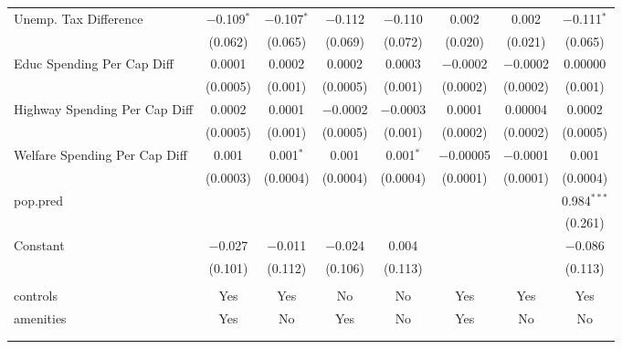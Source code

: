 \begin{table}[!htbp]
\begin{tabular}{@{\extracolsep{5pt}}lccccccc}
  Unemp. Tax Difference & $-$0.109$^{*}$ & $-$0.107$^{*}$ & $-$0.112 & $-$0.110 & 0.002 & 0.002 & $-$0.111$^{*}$ \\ 
  & (0.062) & (0.065) & (0.069) & (0.072) & (0.020) & (0.021) & (0.065) \\ 
  Educ Spending Per Cap Diff & 0.0001 & 0.0002 & 0.0002 & 0.0003 & $-$0.0002 & $-$0.0002 & 0.00000 \\ 
  & (0.0005) & (0.001) & (0.0005) & (0.001) & (0.0002) & (0.0002) & (0.001) \\ 
  Highway Spending Per Cap Diff & 0.0002 & 0.0001 & $-$0.0002 & $-$0.0003 & 0.0001 & 0.00004 & 0.0002 \\ 
  & (0.0005) & (0.001) & (0.0005) & (0.001) & (0.0002) & (0.0002) & (0.0005) \\ 
  Welfare Spending Per Cap Diff & 0.001 & 0.001$^{*}$ & 0.001 & 0.001$^{*}$ & $-$0.00005 & $-$0.0001 & 0.001 \\ 
  & (0.0003) & (0.0004) & (0.0004) & (0.0004) & (0.0001) & (0.0001) & (0.0004) \\ 
  pop.pred &  &  &  &  &  &  & 0.984$^{***}$ \\ 
  &  &  &  &  &  &  & (0.261) \\ 
  Constant & $-$0.027 & $-$0.011 & $-$0.024 & 0.004 &  &  & $-$0.086 \\ 
  & (0.101) & (0.112) & (0.106) & (0.113) &  &  & (0.113) \\ 
 \hline \\[-1.8ex] 
controls & Yes & Yes & No & No & Yes & Yes & Yes \\ 
amenities & Yes & No & Yes & No & Yes & No & No \\ 
\hline \\[-1.8ex] 
\hline 
\hline \\[-1.8ex] 
\end{tabular} 
\end{table} 
